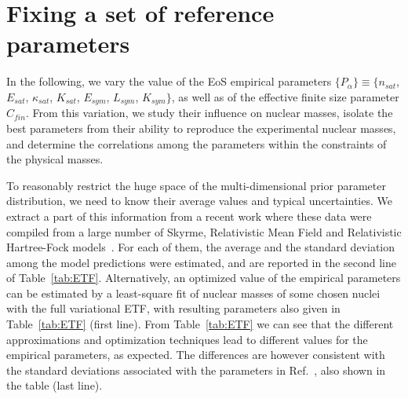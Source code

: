 \documentclass
[aps,prc,twocolumn,showpacs,showkeys,amsmath,floatfix,superscriptaddress]{revtex4}
\begin{document}
{\section{Fixing a set of reference parameters} \label{sec:reference}

In the following, we vary the value of the EoS empirical parameters 
$\{P_\alpha\}\equiv \{ n_{sat}$, $E_{sat}$, $\kappa_{sat}$, $K_{sat}$, $E_{sym}$, $L_{sym}$, $K_{sym}\}$, as well as of the effective finite size parameter 
$C_{fin}$.
{From this variation, we study their influence on nuclear masses, isolate the best parameters from their ability to reproduce the experimental
nuclear masses, and determine the correlations among the parameters within the constraints of the physical masses.}

To reasonably restrict the huge space of the multi-dimensional prior parameter distribution, we need to {know their average values and 
typical uncertainties.}
We extract a part of this information from a recent work where these data were compiled from a large number of Skyrme, Relativistic Mean Field and 
Relativistic Hartree-Fock models~\cite{Casali1}. 
For each of them, the average and the standard deviation among the model predictions were estimated, and are reported in the second line of Table~\ref{tab:ETF}. 
Alternatively, an optimized value of the empirical parameters can be estimated by a least-square fit of  nuclear masses of some chosen nuclei with the full variational ETF, with resulting parameters also given in Table~\ref{tab:ETF} (first line).
From Table~\ref{tab:ETF} we can see that the different approximations and optimization techniques lead to different values for the empirical parameters, as expected. 
The differences are however consistent with the standard deviations associated with the parameters in Ref.~\cite{Casali1}, also shown in the table (last line).

 

}
\end{document}
